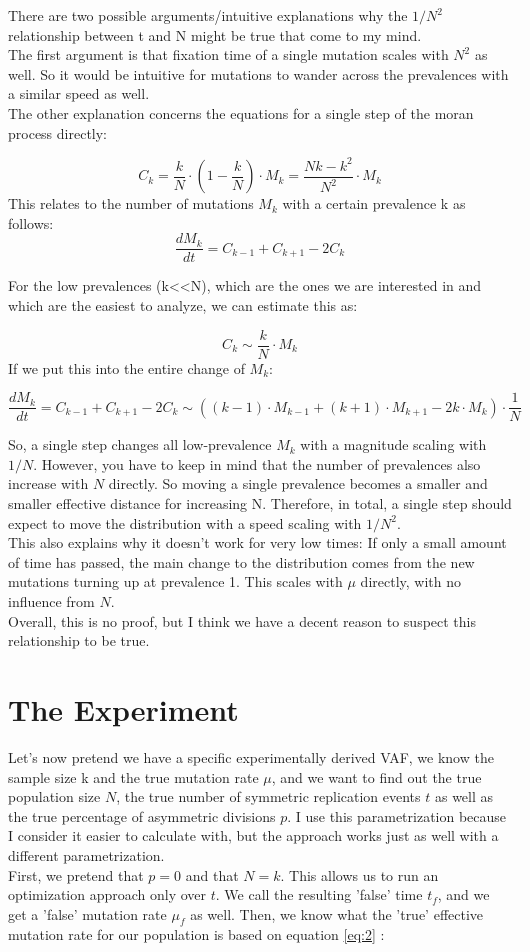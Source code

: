 \documentclass{article}
\numberwithin{equation}{subsection}
\begin{document}
	There are two possible arguments/intuitive explanations why the $ 1/N^2 $ relationship between t and N might be true that come to my mind.\\
	The first argument is that fixation time of a single mutation scales with $ N^2 $ as well. So it would be intuitive for mutations to wander across the prevalences with a similar speed as well.\\
	The other explanation concerns the equations for a single step of the moran process directly:
	
	$$
	{C_k}= \frac{k}{N} \cdot (1-\frac{k}{N}) \cdot M_k = \frac{Nk -k^2}{N^2} \cdot M_k
	$$
	This relates to the number of mutations $ M_k$ with a certain prevalence k as follows:
	$$
	\frac{dM_k}{dt} = C_{k-1} + C_{k+1} - 2 C_{k} 
	$$
	
	For the low prevalences (k<<N), which are the ones we are interested in and which are the easiest to analyze, we can estimate this as:
	
	$$
	C_k \sim \frac{k}{N} \cdot M_k
	$$
	If we put this into the entire change of $ M_k$:
	
	$$
	\frac{dM_k}{dt} = C_{k-1} + C_{k+1} - 2 C_{k} \sim ((k-1) \cdot M_{k-1} + (k+1) \cdot M_{k+1} - 2 k \cdot M_k) \cdot \frac{1}{N}
	$$
	
	So, a single step changes all low-prevalence $ M_k $ with a magnitude scaling with $ 1/N $. However, you have to keep in mind that the number of prevalences also increase with $ N $ directly. So moving a single prevalence becomes a smaller and smaller effective distance for increasing N. Therefore, in total, a single step should expect to move the distribution with a speed scaling with $ 1/N^2 $.\\ This also explains why it doesn't work for very low times: If only a small amount of time has passed, the main change to the distribution comes from the new mutations turning up at prevalence 1. This scales with $ \mu $ directly, with no influence from $ N $.\\
	Overall, this is no proof, but I think we have a decent reason to suspect this relationship to be true.
	
	\section{The Experiment}
	Let's now pretend we have a specific experimentally derived VAF, we know the sample size k and the true mutation rate $ \mu $, and we want to find out the true population size $N$, the true number of symmetric replication events $t$ as well as the true percentage of asymmetric divisions $ p $. I use this parametrization because I consider it easier to calculate with, but the approach works just as well with a different parametrization.\\
	First, we pretend that $ p=0 $ and that $ N=k$. This allows us to run an optimization approach only over $ t $. We call the resulting 'false' time $ t_f$, and we get a 'false' mutation rate $ \mu_f$ as well.
	Then, we know what the 'true' effective mutation rate for our population is based on equation \ref{eq:2} :	
	
\end{document}
